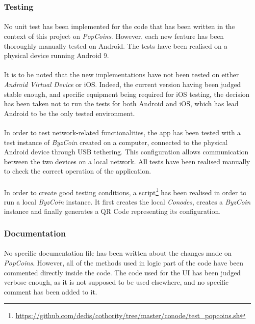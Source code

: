 \subsubsection{Testing}

\paragraph{}

No unit test has been implemented for the code that has been written in the context of this project on \textit{PopCoins}. However, each new feature has been thoroughly manually tested on Android. The tests have been realised on a physical device running Android 9.

\paragraph{}

It is to be noted that the new implementations have not been tested on either \textit{Android Virtual Device} or iOS. Indeed, the current version having been judged stable enough, and specific equipment being required for iOS testing, the decision has been taken not to run the tests for both Android and iOS, which has lead Android to be the only tested environment.

\paragraph{}

In order to test network-related functionalities, the app has been tested with a test instance of \textit{ByzCoin} created on a computer, connected to the physical Android device through USB tethering. This configuration allows communication between the two devices on a local network. All tests have been realised manually to check the correct operation of the application.

\paragraph{}

In order to create good testing conditions, a script\footnote{\url{https://github.com/dedis/cothority/tree/master/conode/test_popcoins.sh}} has been realised in order to run a local \textit{ByzCoin} instance. It first creates the local \textit{Conodes}, creates a \textit{ByzCoin} instance and finally generates a QR Code representing its configuration.

\subsubsection{Documentation}

\paragraph{}

No specific documentation file has been written about the changes made on \textit{PopCoins}. However, all of the methods used in logic part of the code have been commented directly inside the code. The code used for the UI has been judged verbose enough, as it is not supposed to be used elsewhere, and no specific comment has been added to it.